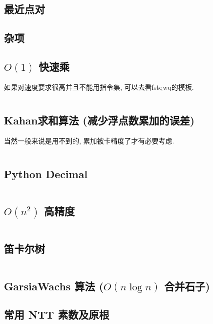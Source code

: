 \documentclass[a4paper, twoside]{article}
\begin{document}
			\subsection{最近点对}
				

		\newpage
	
	\begin{multicols}{2}
		\section{杂项}
			\subsection{$O(1)$ 快速乘}
				如果对速度要求很高并且不能用指令集, 可以去看fstqwq的模板.

				\inputminted{cpp}{../src/misc/O(1)快速乘.cpp}
			
			\subsection{Kahan求和算法 (减少浮点数累加的误差)}
				当然一般来说是用不到的, 累加被卡精度了才有必要考虑.
				\inputminted{cpp}{../src/misc/kahan.cpp}
			
			\subsection{Python Decimal}
				\inputminted{python}{../src/misc/decimal.py}
			
			\subsection{$O(n^2)$ 高精度}
				\inputminted{cpp}{../src/misc/高精度.cpp}
			
			\subsection{笛卡尔树}
				\inputminted{cpp}{../src/misc/笛卡尔树.cpp}
			
			\subsection{GarsiaWachs 算法 ($O(n\log n)$ 合并石子)}
				
			
			\subsection{常用 NTT 素数及原根}
				


\end{multicols}
\end{document}
